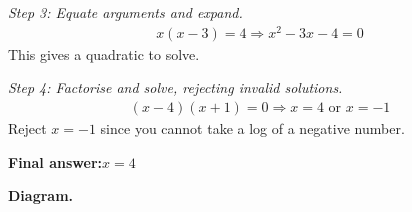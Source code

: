 \documentclass[11pt]{article}
\begin{document}
\textit{Step 3: Equate arguments and expand.}
\[\begin{gathered}
x(x-3) = 4 \Rightarrow x^2 - 3x - 4 = 0
\end{gathered}\]
This gives a quadratic to solve.

\textit{Step 4: Factorise and solve, rejecting invalid solutions.}
\[\begin{gathered}
(x-4)(x+1) = 0 \Rightarrow x = 4 \text{ or } x = -1
\end{gathered}\]
Reject \( x = -1 \) since you cannot take a log of a negative number.

\begin{answerbox}
\textbf{Final answer:}\quad \(\displaystyle  x = 4 \)
\end{answerbox}
\textbf{Diagram.}

\begin{center}
\end{center}
\end{document}
